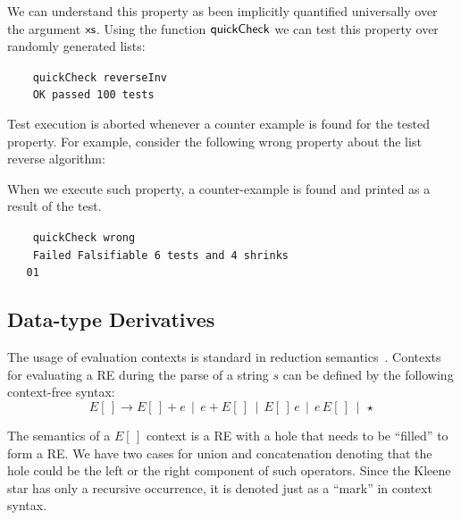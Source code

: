 \documentclass[oneside,12pt]{scrbook}
\def\resethooks{%
	\global\let\SaveRestoreHook\empty
	\global\let\ColumnHook\empty}
\let\hspre\empty
\let\hspost\empty
\theoremstyle{definition}
\newcommand{\D}[1]{\blue{\mathsf{#1}}}
\newcommand{\F}[1]{\green{\mathsf{#1}}}
\newcommand{\V}[1]{\black{\mathsf{#1}}}
\theoremstyle{plain}
\theoremstyle{definition}
\begin{document}
We can understand this property as been implicitly quantified universally over the argument \ensuremath{\V{xs}}.
Using the function \ensuremath{\F{quickCheck}} we can test this property over randomly generated lists:
\begin{tabbing}\tt
	~~~quickCheck~reverseInv\\
	\tt ~~~~OK~passed~100~tests
\end{tabbing}
Test execution is aborted whenever a counter example is found for the tested property. For example,
consider the following wrong property about the list reverse algorithm:
\resethooks
When we execute such property, a counter-example is found and printed as a result of the test.
\begin{tabbing}\tt
	~~~quickCheck~wrong\\
	\tt ~~~~Failed~Falsifiable~6~tests~and~4~shrinks\\
	\tt ~~~01
\end{tabbing}

\subsection{Data-type Derivatives}
\label{subsection:datatypederivatives}

The usage of evaluation contexts is standard in reduction semantics~\cite{Felleisen2009}.
Contexts for evaluating a RE during the parse of a string $s$ can be defined by the following
context-free syntax:
\[E[\,] \to E[\,]+ e\,\mid\,e + E[\,]\,\mid\,E[\,]\,e\,\mid\,e\,E[\,]\,\mid\,\star\]

The semantics of a $E[\,]$ context is a RE with a hole that needs to be ``filled'' to form a
RE. We have two cases for union and concatenation denoting that the hole could be the left
or the right component of such operators. Since the Kleene star has only a recursive occurrence,
it is denoted just as a ``mark'' in context syntax.
\end{document}
